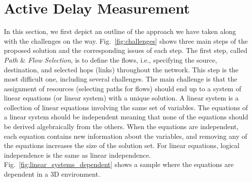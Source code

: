 \documentclass[10pt, journal, letterpaper]{IEEEtran}
\begin{document}





\section{Active Delay Measurement}
In this section, we first depict an outline of the approach we have taken along with the challenges on the way. Fig.~\ref{fig:challenges} shows three main steps of the proposed solution and the corresponding issues of each step. 
The first step, called \textit{Path $\&$ Flow Selection}, is to define the flows, i.e., specifying the source, destination, and selected hops (links) throughout the network. This step is the most difficult one, including several challenges. The main challenge is that the assignment of resources (selecting paths for flows) should end up to a system of linear equations (or linear system) with a unique solution. A linear system is a collection of linear equations involving the same set of variables. The equations of a linear system should be independent meaning that none of the equations should be derived algebraically from the others. When the equations are independent, each equation contains new information about the variables, and removing any of the equations increases the size of the solution set. For linear equations, logical independence is the same as linear independence. Fig.~\ref{fig:linear_systems_dependent} shows a sample where the equations are dependent in a 3D environment.
\end{document}

